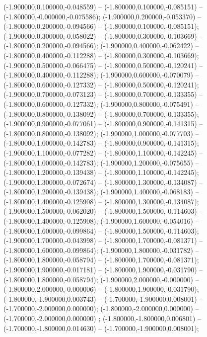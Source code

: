  (-1.900000,0.100000,-0.048559) -- (-1.800000,0.100000,-0.085151) -- (-1.800000,-0.000000,-0.075586);
 (-1.900000,0.200000,-0.053370) -- (-1.800000,0.200000,-0.094566) -- (-1.800000,0.100000,-0.085151);
 (-1.900000,0.300000,-0.058022) -- (-1.800000,0.300000,-0.103669) -- (-1.800000,0.200000,-0.094566);
 (-1.900000,0.400000,-0.062422) -- (-1.800000,0.400000,-0.112288) -- (-1.800000,0.300000,-0.103669);
 (-1.900000,0.500000,-0.066475) -- (-1.800000,0.500000,-0.120241) -- (-1.800000,0.400000,-0.112288);
 (-1.900000,0.600000,-0.070079) -- (-1.800000,0.600000,-0.127332) -- (-1.800000,0.500000,-0.120241);
 (-1.900000,0.700000,-0.073123) -- (-1.800000,0.700000,-0.133355) -- (-1.800000,0.600000,-0.127332);
 (-1.900000,0.800000,-0.075491) -- (-1.800000,0.800000,-0.138092) -- (-1.800000,0.700000,-0.133355);
 (-1.900000,0.900000,-0.077061) -- (-1.800000,0.900000,-0.141315) -- (-1.800000,0.800000,-0.138092);
 (-1.900000,1.000000,-0.077703) -- (-1.800000,1.000000,-0.142783) -- (-1.800000,0.900000,-0.141315);
 (-1.900000,1.100000,-0.077282) -- (-1.800000,1.100000,-0.142245) -- (-1.800000,1.000000,-0.142783);
 (-1.900000,1.200000,-0.075655) -- (-1.800000,1.200000,-0.139438) -- (-1.800000,1.100000,-0.142245);
 (-1.900000,1.300000,-0.072674) -- (-1.800000,1.300000,-0.134087) -- (-1.800000,1.200000,-0.139438);
 (-1.900000,1.400000,-0.068183) -- (-1.800000,1.400000,-0.125908) -- (-1.800000,1.300000,-0.134087);
 (-1.900000,1.500000,-0.062020) -- (-1.800000,1.500000,-0.114603) -- (-1.800000,1.400000,-0.125908);
 (-1.900000,1.600000,-0.054016) -- (-1.800000,1.600000,-0.099864) -- (-1.800000,1.500000,-0.114603);
 (-1.900000,1.700000,-0.043998) -- (-1.800000,1.700000,-0.081371) -- (-1.800000,1.600000,-0.099864);
 (-1.900000,1.800000,-0.031782) -- (-1.800000,1.800000,-0.058794) -- (-1.800000,1.700000,-0.081371);
 (-1.900000,1.900000,-0.017181) -- (-1.800000,1.900000,-0.031790) -- (-1.800000,1.800000,-0.058794);
 (-1.900000,2.000000,-0.000000) -- (-1.800000,2.000000,-0.000006) -- (-1.800000,1.900000,-0.031790);
 (-1.800000,-1.900000,0.003743) -- (-1.700000,-1.900000,0.008001) -- (-1.700000,-2.000000,0.000000);
 (-1.800000,-2.000000,0.000000) -- (-1.700000,-2.000000,0.000000) ;
 (-1.800000,-1.800000,0.006801) -- (-1.700000,-1.800000,0.014630) -- (-1.700000,-1.900000,0.008001);
